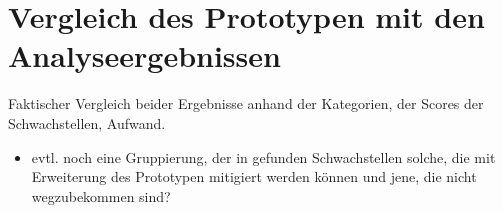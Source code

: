\section{Vergleich des Prototypen mit den Analyseergebnissen}
\label{sec:comparison}
    Faktischer Vergleich beider Ergebnisse anhand der Kategorien, der Scores der Schwachstellen, Aufwand.
    \begin{itemize}[noitemsep]
        \item evtl. noch eine Gruppierung, der in  gefunden Schwachstellen solche, die mit Erweiterung des Prototypen mitigiert werden können und jene, die nicht wegzubekommen sind?
    \end{itemize}
    